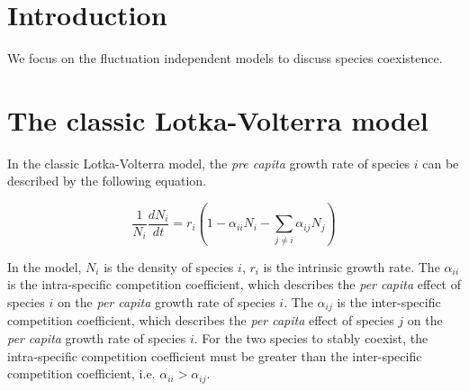 \documentclass[fleqn]{article}
\begin{document}


\section*{Introduction}

We focus on the fluctuation independent models to discuss species coexistence. 

\newpage
\section{The classic Lotka-Volterra model}

In the classic Lotka-Volterra model, the \textit{pre capita} growth rate of species $i$ can be described by the following equation. 

\begin{equation}\label{eq:1}
 \frac{1}{N_i}\frac{dN_i}{dt} = r_i(1 - \alpha_{ii}N_i - \sum_{j \neq i}^{} \alpha_{ij}N_j)
\end{equation}

\noindent In the model, $N_{i}$ is the density of species $i$, $r_i$ is the intrinsic growth rate. The $\alpha_{ii}$ is the intra-specific competition coefficient, which describes the \textit{per capita} effect of species $i$ on the \textit{per capita} growth rate of species $i$. The $\alpha_{ij}$ is the inter-specific competition coefficient, which describes the \textit{per capita} effect of species $j$ on the \textit{per capita} growth rate of species $i$. For the two species to stably coexist, the intra-specific competition coefficient must be greater than the inter-specific competition coefficient, i.e. $\alpha_{ii} > \alpha_{ij}$. 
\end{document}
